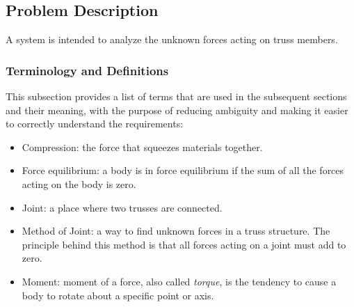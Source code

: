 \documentclass[12pt]{article}
\begin{document}
\subsection{Problem Description} \label{Sec_pd}

A system is intended to analyze the unknown forces acting on truss members.

\subsubsection{Terminology and  Definitions}

This subsection provides a list of terms that are used in the subsequent
sections and their meaning, with the purpose of reducing ambiguity and making it
easier to correctly understand the requirements:

\begin{itemize}
	
	\item Compression: the force that squeezes materials together.
	
\end{itemize}

\begin{itemize}
	
	\item Force equilibrium: a body is in force equilibrium if the sum of all 
	the forces acting on the body is zero. 
	
\end{itemize}

\begin{itemize}
	
	\item Joint: a place where two trusses are connected.
	
\end{itemize}

\begin{itemize}
	
	\item Method of Joint: a way to find unknown forces in a truss structure. 
	The principle behind this method is that all forces acting on a joint must 
	add to zero.
	
\end{itemize}

\begin{itemize}
	
	\item Moment: moment of a force, also called \textit{torque}, is the 
	tendency to cause a body to rotate about a 	specific point or axis. 
	
\end{itemize}
\end{document}

